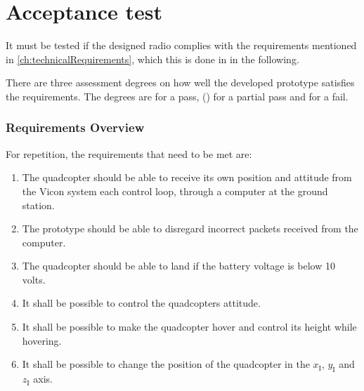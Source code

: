 \chapter{Acceptance test}

It must be tested if the designed radio complies with the requirements mentioned in \autoref{ch:technicalRequirements}, which this is done in in the following. %

There are three assessment degrees on how well the developed prototype satisfies the requirements. The degrees are  for a pass, () for a partial pass and  for a fail. 

\subsection*{Requirements Overview}
For repetition, the requirements that need to be met are:
\begin{enumerate}[label=\textbf{\arabic*})]
\item {The quadcopter should be able to receive its own position and attitude from the Vicon system each control loop, through a computer at the ground station.}
\item {The prototype should be able to disregard incorrect packets received from the computer.}
\item {The quadcopter should be able to land if the battery voltage is below 10 volts.}
\item {It shall be possible to control the quadcopters attitude.}
\item {It shall be possible to make the quadcopter hover and control its height while hovering.}
\item {It shall be possible to change the position of the quadcopter in the $x_{\mathrm{I}}$, $y_{\mathrm{I}}$ and $z_{\mathrm{I}}$ axis.}
\end{enumerate}

\newpage
